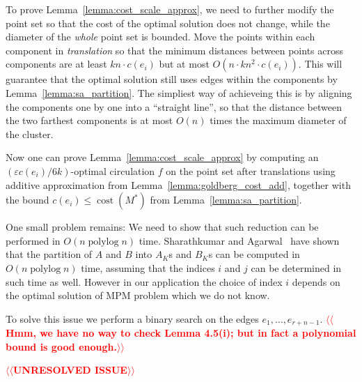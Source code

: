 \documentclass[a4paper,UKenglish]{socg-lipics-v2018}
\makeatletter
\def\note#1{\textcolor{red}{{#1}}}
\def\polylog{\mathop{\mathrm{polylog}}}
\def\eps{\varepsilon}
\def\cost{\operatorname{cost}}
\theoremstyle{plain}
\numberwithin{figure}{section}
\def\n@te#1{\textsf{\boldmath \textbf{$\langle\!\langle$#1$\rangle\!\rangle$}}\leavevmode}
\def\note#1{\textcolor{red}{\n@te{#1}}}
\makeatother
\begin{document}
\begin{toappendix}
To prove Lemma~\ref{lemma:cost_scale_approx}, we need to further modify the point set so that the cost of the optimal solution does not change, while the diameter of the \emph{whole} point set is bounded.
%
Move the points within each component in \emph{translation} so that the minimum distances between points across components are at least $kn \cdot c(e_i)$ but at most $O(n \cdot kn^2 \cdot c(e_i))$.  This will guarantee that the optimal solution still uses edges within the components by Lemma~\ref{lemma:sa_partition}.  The simpliest way of achieveing this is by aligning the components one by one into a ``straight line'', so that the distance between the two farthest components is at most $O(n)$ times the maximum diameter of the cluster.

Now one can prove Lemma~\ref{lemma:cost_scale_approx} by computing an $(\eps c(e_i)/6k)$-optimal
circulation $f$ on the point set after translations using additive approximation from Lemma~\ref{lemma:goldberg_cost_add}, together with the bound $c(e_i) \leq \cost(M^*)$ from
Lemma~\ref{lemma:sa_partition}.


One small problem remains: We need to show that such reduction can be performed in $O(n\polylog n)$ time.
Sharathkumar and Agarwal~\cite{SA12} have shown that the partition of $A$ and $B$ into $A_K$s and $B_K$s can be computed in $O(n \polylog n)$ time, assuming that the indices $i$ and $j$ can be determined in such time as well.  However in our application the choice of index $i$ depends on the optimal solution of MPM problem which we do not know.

To solve this issue we perform a binary search on the edges $e_1, \ldots, e_{r+n-1}$.  \note{Hmm, we have no way to check Lemma 4.5(i); but in fact a polynomial bound is good enough.}

\note{UNRESOLVED ISSUE}



\end{toappendix}
\end{document}
